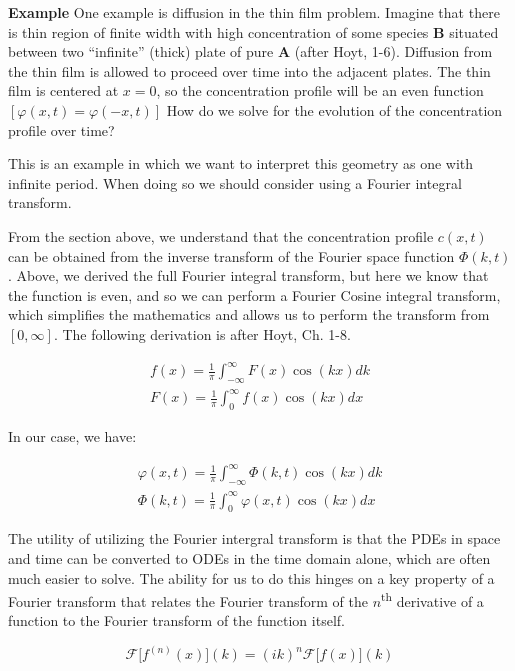 \begin{displayquote}
\textbf{Example} One example is diffusion in the thin film problem. Imagine that there is thin region of finite width with high concentration of some species \textbf{B} situated between two ``infinite'' (thick) plate of pure \textbf{A} (after Hoyt, 1-6). Diffusion from the thin film is allowed to proceed over time into the adjacent plates. The thin film is centered at $x = 0$, so the concentration profile will be an even function $[\varphi(x,t) = \varphi(-x,t)]$  How do we solve for the evolution of the concentration profile over time?

This is an example in which we want to interpret this geometry as one with infinite period. When doing so we should consider using a Fourier integral transform.

From the section above, we understand that the concentration profile $c(x,t)$ can be obtained from the inverse transform of the Fourier space function $\Phi(k,t)$. Above, we derived the full Fourier integral transform, but here we know that the function is even, and so we can perform a Fourier Cosine integral transform, which simplifies the mathematics and allows us to perform the transform from $[0,\infty]$. The following derivation is after Hoyt, Ch. 1-8.

\begin{align}
	f(x) = \frac{1}{\pi} \int_{-\infty}^{\infty} F(x) \cos{(kx)} dk\\
	F(x) = \frac{1}{\pi} \int_0^{\infty} f(x) \cos{(kx)} dx
\end{align}

In our case, we have:

\begin{align}
	\varphi(x,t) = \frac{1}{\pi} \int_{-\infty}^{\infty} \Phi(k,t) \cos{(kx)} dk\\
	\Phi(k,t) = \frac{1}{\pi} \int_0^{\infty} \varphi(x,t) \cos{(kx)} dx
	\label{eq:OddSol1}
\end{align}

The utility of utilizing the Fourier intergral transform is that the PDEs in space and time can be converted to ODEs in the time domain alone, which are often much easier to solve. The ability for us to do this hinges on a key property of a Fourier transform that relates the Fourier transform of the $n$\textsuperscript{th} derivative of a function to the Fourier transform of the function itself. 

\begin{equation}
	\mathscr{F}\big[f^{(n)}(x)\big](k) = (ik)^{n}\mathscr{F}\big[f(x)\big](k)
\label{eq:}
\end{equation}


\end{displayquote}
